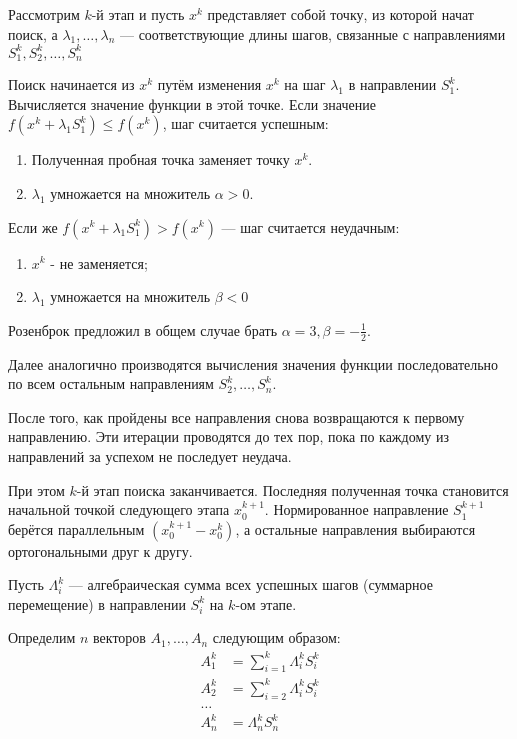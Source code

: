 \documentclass[a4paper,12pt,notitlepage,pdftex,headsepline]{scrartcl}
\begin{document}
  Рассмотрим $k$-й этап и пусть $x^k$ представляет собой точку, из которой
  начат поиск, а $\lambda_1, \dots, \lambda_n$ --- соответствующие длины
  шагов, связанные с направлениями $S_1^k, S_2^k, \dots, S_n^k$

  Поиск начинается из $x^k$ путём изменения $x^k$ на шаг $\lambda_1$ в
  направлении $S_1^k$.
  Вычисляется значение функции в этой точке.
  Если значение $f\left(x^k + \lambda_1 S_1^k\right) \leqslant
  f\left(x^k\right)$, шаг считается успешным:
  \begin{enumerate}
    \item Полученная пробная точка заменяет точку $x^k$.
    \item $\lambda_1$ умножается на множитель $\alpha > 0$.
  \end{enumerate}

  Если же $f\left(x^k + \lambda_1 S_1^k\right) > f\left(x^k\right)$ ---
  шаг считается неудачным:
  \begin{enumerate}
    \item $x^k$ - не заменяется;
    \item $\lambda_1$ умножается на множитель $\beta < 0$
  \end{enumerate}

  Розенброк предложил в общем случае брать $\alpha = 3, \beta = -\frac{1}{2}$.

  Далее аналогично производятся вычисления значения функции последовательно по
  всем остальным направлениям $S_2^k, \dots, S_n^k$.

  После того, как пройдены все направления снова возвращаются к первому
  направлению.
  Эти итерации проводятся до тех пор, пока по каждому из направлений за
  успехом не последует неудача.

  При этом $k$-й этап поиска заканчивается. Последняя полученная точка
  становится начальной точкой следующего этапа $x_0^{k+1}$.
  Нормированное направление $S_1^{k+1}$ берётся параллельным $(x_0^{k+1} -
  x_0^k)$, а остальные направления выбираются ортогональными друг к другу.

  Пусть $\Lambda_i^k$ --- алгебраическая сумма всех успешных шагов (суммарное
  перемещение) в направлении $S_i^k$ на $k$-ом этапе.

  Определим $n$ векторов $A_1, \dots, A_n$ следующим образом:
  \begin{align*}
    A_1^k &= \sum_{i = 1}^k\Lambda_i^k S_i^k\\
    A_2^k &= \sum_{i = 2}^k\Lambda_i^k S_i^k\\
    \dots\\
    A_n^k &= \Lambda_n^k S_n^k
  \end{align*}
\end{document}
